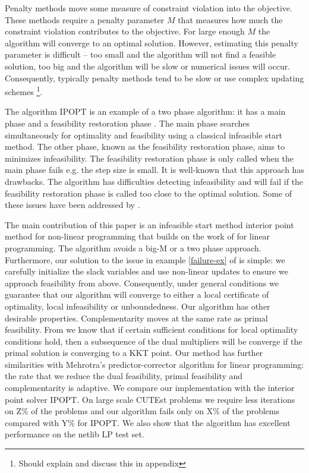 \documentclass{article}
\begin{document}
Penalty methods move some measure of constraint violation into the objective. These methods require a penalty parameter $M$ that measures how much the constraint violation contributes to the objective. For large enough $M$ the algorithm will converge to an optimal solution. However, estimating this penalty parameter is difficult -- too small and the algorithm will not find a feasible solution, too big and the algorithm will be slow or numerical issues will occur. Consequently, typically penalty methods tend to be slow \cite[Algorithm 1]{curtis2012penalty} or use complex updating schemes \cite[Algorithm 2]{curtis2012penalty}\footnote{Should explain and discuss this in appendix}. 

The algorithm IPOPT is an example of a two phase algorithm: it has a main phase and a feasibility restoration phase  \cite{wachter2006implementation}. The main phase searches simultaneously for optimality and feasibility using a classical infeasible start method. The other phase, known as the feasibility restoration phase, aims to minimizes infeasibility. The feasibility restoration phase is only called when the main phase fails e.g. the step size is small. It is well-known that this approach has drawbacks. The algorithm has difficulties detecting infeasibility \cite[Table 15]{huang2016solution} and will fail if the feasibility restoration phase is called too close to the optimal solution. Some of these issues have been addressed by \cite{nocedal2014interior}. 

The main contribution of this paper is an infeasible start method interior point method for non-linear programming that builds on the work of \cite{lustig1990feasibility, mehrotra1992implementation} for linear programming. The algorithm avoids a big-M or a two phase approach. Furthermore, our solution to the issue in example \eqref{failure-ex} of \cite{wachter2000failure} is simple: we   carefully initialize the slack variables and use non-linear updates to ensure we approach feasibility from above. Consequently, under general conditions we guarantee that our algorithm will converge to either a local certificate of optimality, local infeasibility or unboundedness. Our algorithm has other desirable properties. Complementarity moves at the same rate as primal feasibility. From \cite{lagIPM} we know that if certain sufficient conditions for local optimality conditions hold, then a subsequence of the dual multipliers will be converge if the primal solution is converging to a KKT point.  Our method has further similarities with Mehrotra's \cite{mehrotra1992implementation} predictor-corrector algorithm for linear programming: the rate that we reduce the dual feasibility, primal feasibility and complementarity is adaptive.
We compare our implementation with the interior point solver IPOPT. On large scale CUTEst problems we require less iterations on Z\% of the problems and our algorithm fails only on X\% of the problems compared with Y\% for IPOPT. We also show that the algorithm has excellent performance on the netlib LP test set.
\end{document}

